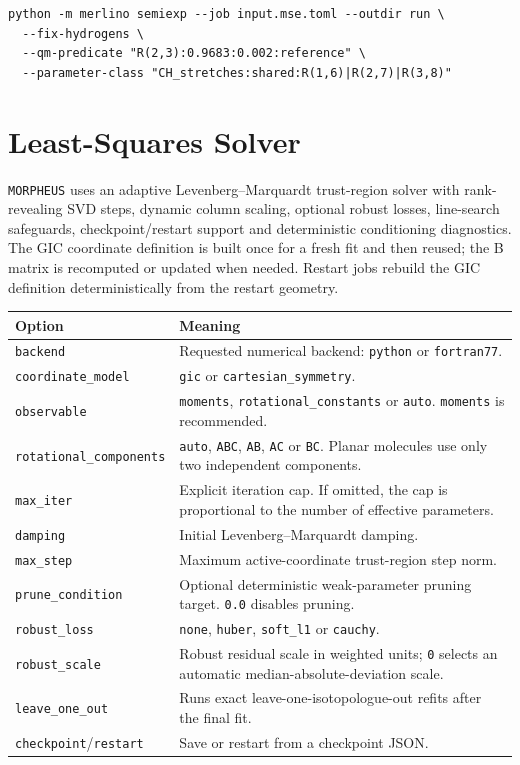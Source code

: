 \documentclass[11pt]{article}
\newcommand{\program}{\texttt{MORPHEUS}}
\begin{document}
\begin{lstlisting}[style=merlino]
python -m merlino semiexp --job input.mse.toml --outdir run \
  --fix-hydrogens \
  --qm-predicate "R(2,3):0.9683:0.002:reference" \
  --parameter-class "CH_stretches:shared:R(1,6)|R(2,7)|R(3,8)"
\end{lstlisting}

\section{Least-Squares Solver}

\program{} uses an adaptive Levenberg--Marquardt trust-region solver with
rank-revealing SVD steps, dynamic column scaling, optional robust losses,
line-search safeguards, checkpoint/restart support and deterministic
conditioning diagnostics.  The GIC coordinate definition is built once for a
fresh fit and then reused; the B matrix is recomputed or updated when needed.
Restart jobs rebuild the GIC definition deterministically from the restart
geometry.

\begin{longtable}{@{}p{0.30\textwidth}p{0.60\textwidth}@{}}
\toprule
Option & Meaning \\
\midrule
\endhead
\texttt{backend} & Requested numerical backend: \texttt{python} or
\texttt{fortran77}. \\
\texttt{coordinate\_model} & \texttt{gic} or
\texttt{cartesian\_symmetry}. \\
\texttt{observable} & \texttt{moments}, \texttt{rotational\_constants} or
\texttt{auto}.  \texttt{moments} is recommended. \\
\texttt{rotational\_components} & \texttt{auto}, \texttt{ABC},
\texttt{AB}, \texttt{AC} or \texttt{BC}.  Planar molecules use only two
independent components. \\
\texttt{max\_iter} & Explicit iteration cap.  If omitted, the cap is
proportional to the number of effective parameters. \\
\texttt{damping} & Initial Levenberg--Marquardt damping. \\
\texttt{max\_step} & Maximum active-coordinate trust-region step norm. \\
\texttt{prune\_condition} & Optional deterministic weak-parameter pruning
target.  \texttt{0.0} disables pruning. \\
\texttt{robust\_loss} & \texttt{none}, \texttt{huber},
\texttt{soft\_l1} or \texttt{cauchy}. \\
\texttt{robust\_scale} & Robust residual scale in weighted units; \texttt{0}
selects an automatic median-absolute-deviation scale. \\
\texttt{leave\_one\_out} & Runs exact leave-one-isotopologue-out refits after
the final fit. \\
\texttt{checkpoint}/\texttt{restart} & Save or restart from a checkpoint JSON.\\
\bottomrule
\end{longtable}
\end{document}
